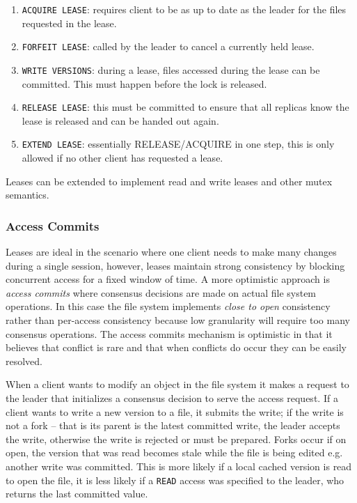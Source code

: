 \documentclass[letterpaper,twocolumn,10pt]{article}
\begin{document}
\begin{enumerate}
    \item \texttt{ACQUIRE LEASE}: requires client to be as up to date as the
    leader for the files requested in the lease.
    \item \texttt{FORFEIT LEASE}: called by the leader to cancel a currently
    held lease.
    \item \texttt{WRITE VERSIONS}: during a lease, files accessed during the
    lease can be committed. This must happen before the lock is released.
    \item \texttt{RELEASE LEASE}: this must be committed to ensure that all
    replicas know the lease is released and can be handed out again.
    \item \texttt{EXTEND LEASE}: essentially RELEASE/ACQUIRE in one step,
    this is only allowed if no other client has requested a lease.
\end{enumerate}

Leases can be extended to implement read and write leases and other mutex
semantics.

\subsubsection*{Access Commits}

Leases are ideal in the scenario where one client needs to make many changes
during a single session, however, leases maintain strong consistency by
blocking concurrent access for a fixed window of time.
A more optimistic approach is \textit{access commits} where consensus
decisions are made on actual file system operations.
In this case the file system implements \textit{close to open} consistency
rather than per-access consistency because low granularity will require too
many consensus operations.
The access commits mechanism is optimistic in that it believes that conflict
is rare and that when conflicts do occur they can be easily resolved.

When a client wants to modify an object in the file system it makes a request
to the leader that initializes a consensus decision to serve the access
request.
If a client wants to write a new version to a file, it submits the write; if
the write is not a fork -- that is its parent is the latest committed write,
the leader accepts the write, otherwise the write is rejected or must be
prepared.
Forks occur if on open, the version that was read becomes stale while the
file is being edited e.g. another write was committed.
This is more likely if a local cached version is read to open the file, it is
less likely if a \texttt{READ} access was specified to the leader, who
returns the last committed value.
\end{document}
